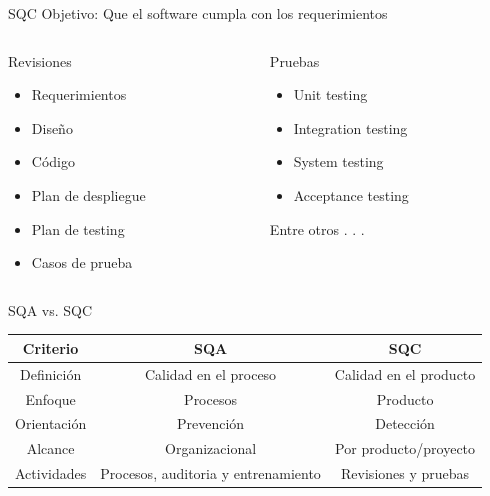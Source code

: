 \documentclass[aspectratio=169]{beamer}
\begin{document}
\begin{frame}{SQC}
Objetivo: Que el software cumpla con los requerimientos
\begin{columns}[T]
	\begin{column}[T]{5cm}
		Revisiones
		\begin{itemize}
			\item Requerimientos
			\item Diseño
			\item Código
			\item Plan de despliegue
			\item Plan de testing
			\item Casos de prueba
		\end{itemize}
	\end{column}
	\begin{column}[T]{5cm} %
		Pruebas
		\begin{itemize}
			\item Unit testing
			\item Integration testing
			\item System testing
			\item Acceptance testing
		\end{itemize}
	Entre otros . . .
	\end{column}
\end{columns}
\end{frame}


\begin{frame}{SQA vs. SQC}
\small
\begin{table}
\begin{tabular}{|c|c|c|}
	\hline 
	Criterio &  SQA &  SQC\\ 
	\hline 
	Definición &  Calidad en el proceso & Calidad en el producto \\ 
	\hline 
	Enfoque & Procesos &  Producto \\ 
	\hline 
	Orientación & Prevención & Detección \\ 
	\hline 
	Alcance & Organizacional  & Por producto/proyecto  \\ 
	\hline 
	Actividades& Procesos, auditoria y entrenamiento & Revisiones y pruebas \\ 
	\hline 
\end{tabular} 
\end{table} 
\end{frame}
\end{document}
